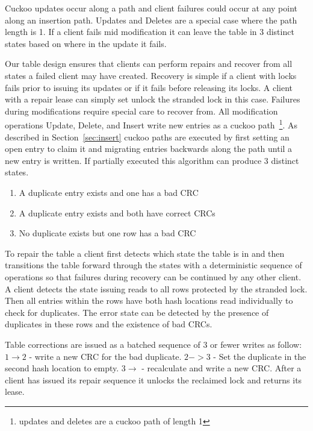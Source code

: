 Cuckoo updates occur along a path
and client failures could occur at any point along an
insertion path. Updates and Deletes are a special case where
the path length is 1. If a client fails mid modification it
can leave the table in 3 distinct states based on where in
the update it fails. 

Our table design ensures that clients can perform repairs
and recover from all states a failed client may have
created. Recovery is simple if a client with locks fails
prior to issuing its updates or if it fails before releasing
its locks. A client with a repair lease can simply set
unlock the stranded lock in this case. Failures during
modifications require special care to recover from. All
modification operations Update, Delete, and Insert write new
entries as a cuckoo path~\footnote{updates and deletes are a
cuckoo path of length 1}. As described in
Section~\ref{sec:insert} cuckoo paths are executed by first
setting an open entry to claim it and migrating entries
backwards along the path until a new entry is written. If
partially executed this algorithm can produce 3 distinct
states.

\begin{enumerate}
    \item{A duplicate entry exists and one has a bad CRC}
    \item{A duplicate entry exists and both have correct CRCs} 
    \item{No duplicate exists but one row has a bad CRC}
\end{enumerate}

To repair the table a client first detects which state the
table is in and then transitions the table forward through
the states with a deterministic sequence of operations so
that failures during recovery can be continued by any other
client. A client detects the state issuing reads to all rows
protected by the stranded lock. Then all entries within the
rows have both hash locations read individually to check for
duplicates. The error state can be detected by the presence
of duplicates in these rows and the existence of bad CRCs.

Table corrections are issued as a batched sequence of 3 or
fewer writes as follow: $1 \rightarrow 2$ - write a new CRC
for the bad duplicate.  $2->3$ - Set the duplicate in the
second hash location to empty. $3\rightarrow$ - recalculate
and write a new CRC. After a client has issued its repair
sequence it unlocks the reclaimed lock and returns its
lease.


